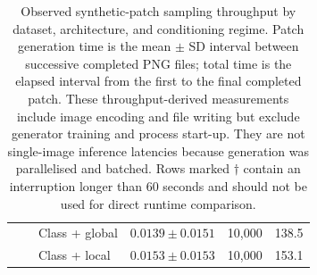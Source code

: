 \begin{table}[htbp]
\begin{tabular}{lllrrr}
 &  & Class + global & $0.0139 \pm 0.0151$ & 10,000 & 138.5 \\
 &  & Class + local & $0.0153 \pm 0.0153$ & 10,000 & 153.1 \\
\bottomrule
\end{tabular}
\caption{Observed synthetic-patch sampling throughput by dataset, architecture, and conditioning regime. Patch generation time is the mean $\pm$ SD interval between successive completed PNG files; total time is the elapsed interval from the first to the final completed patch. These throughput-derived measurements include image encoding and file writing but exclude generator training and process start-up. They are not single-image inference latencies because generation was parallelised and batched. Rows marked $\dagger$ contain an interruption longer than 60 seconds and should not be used for direct runtime comparison.}
\label{tab:patch-generation-times}
\end{table}
